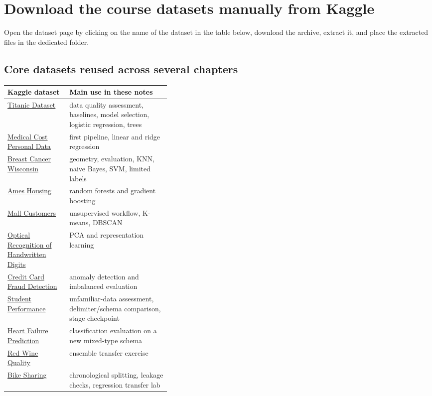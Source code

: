 \section{Download the course datasets manually from Kaggle}

Open the dataset page by clicking on the name of the dataset in the table below, download the archive, extract it, and place the extracted files in the dedicated folder.

\subsection{Core datasets reused across several chapters}

\begin{mltable}
\footnotesize
\begin{tabularx}{\linewidth}{@{}p{0.38\linewidth}X@{}}
\toprule
\rowcolor{MLPaleBlue!92}
Kaggle dataset & Main use in these notes \\
\midrule
\href{https://www.kaggle.com/datasets/yasserh/titanic-dataset}{Titanic Dataset} & data quality assessment, baselines, model selection, logistic regression, trees \\
\href{https://www.kaggle.com/datasets/mirichoi0218/insurance}{Medical Cost Personal Data} & first pipeline, linear and ridge regression \\
\href{https://www.kaggle.com/datasets/uciml/breast-cancer-wisconsin-data}{Breast Cancer Wisconsin} & geometry, evaluation, KNN, naive Bayes, SVM, limited labels \\
\href{https://www.kaggle.com/datasets/shashanknecrothapa/ames-housing-dataset}{Ames Housing} & random forests and gradient boosting \\
\href{https://www.kaggle.com/datasets/vjchoudhary7/customer-segmentation-tutorial-in-python}{Mall Customers} & unsupervised workflow, K-means, DBSCAN \\
\href{https://www.kaggle.com/datasets/yadavhim/optical-recognition-of-handwritten-digits}{Optical Recognition of Handwritten Digits} & PCA and representation learning \\
\href{https://www.kaggle.com/datasets/miadul/credit-card-fraud-detection-dataset}{Credit Card Fraud Detection} & anomaly detection and imbalanced evaluation \\
\href{https://www.kaggle.com/datasets/larsen0966/student-performance-data-set}{Student Performance} & unfamiliar-data assessment, delimiter/schema comparison, stage checkpoint \\
\href{https://www.kaggle.com/datasets/fedesoriano/heart-failure-prediction}{Heart Failure Prediction} & classification evaluation on a new mixed-type schema \\
\href{https://www.kaggle.com/datasets/uciml/red-wine-quality-cortez-et-al-2009}{Red Wine Quality} & ensemble transfer exercise \\
\href{https://www.kaggle.com/datasets/lakshmi25npathi/bike-sharing-dataset}{Bike Sharing} & chronological splitting, leakage checks, regression transfer lab \\
\bottomrule
\end{tabularx}
\end{mltable}

